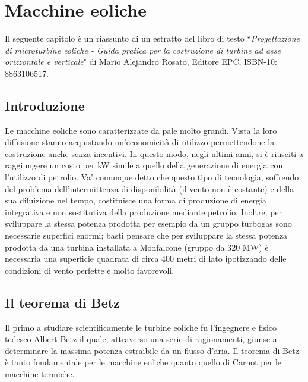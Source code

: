 \chapter{Macchine eoliche}
Il seguente capitolo è un riassunto di un estratto del libro di testo ``\textit{Progettazione di microturbine eoliche - Guida pratica per la costruzione di turbine ad asse orizzontale e verticale}" di Mario Alejandro Rosato, Editore EPC, ISBN-10: 8863106517.
\section{Introduzione}
Le macchine eoliche sono caratterizzate da pale molto grandi. Vista la loro diffusione stanno acquistando un'economicità di utilizzo permettendone la costruzione anche senza incentivi. In questo modo, negli ultimi anni, si è riusciti a raggiungere un costo per kW simile a quello della generazione di energia con l'utilizzo di petrolio. Va' comunque detto che questo tipo di tecnologia, soffrendo del problema dell'intermittenza di disponibilità (il vento non è costante) e della sua diluizione nel tempo, costituisce una forma di produzione di energia integrativa e non sostitutiva della produzione mediante petrolio. Inoltre, per sviluppare la stessa potenza prodotta per esempio da un gruppo turbogas sono necessarie superfici enormi; basti pensare che per sviluppare la stessa potenza prodotta da una turbina installata a Monfalcone (gruppo da 320 MW) è necessaria una superficie quadrata di circa 400 metri di lato ipotizzando delle condizioni di vento perfette e molto favorevoli.
\section{Il teorema di Betz}
Il primo a studiare scientificamente le turbine eoliche fu l'ingegnere e fisico tedesco Albert Betz il quale, attraverso una serie di ragionamenti, giunse a determinare la massima potenza estraibile da un flusso d'aria. Il teorema di Betz è tanto fondamentale per le macchine eoliche quanto quello di Carnot per le macchine termiche. 

